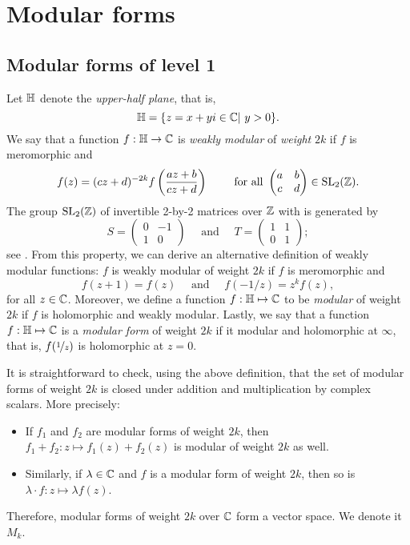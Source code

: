 \section{Modular forms}
\subsection{Modular forms of level 1}
Let $\mathbb{H}$ denote the \textit{upper-half plane}, that is, 
$$\mathbb{H} = \{z = x+yi \in \mathbb{C} | \ y>0 \}.$$
We say that a function $f:\mathbb{H} \to \mathbb{C}$ is \textit{weakly modular} of \textit{weight} $2k$ if $f$ is meromorphic and
$$
f(z) = (cz+d)^{-2k} f \left( \frac{az+b}{cz+d} \right)
\qquad \text{ for all }
\begin{pmatrix} a & b\\
				c & d
\end{pmatrix}
\in \text{SL}_{2}(\mathbb{Z}).
$$
The group $\text{SL}_{2}(\mathbb{Z})$ of invertible 2-by-2 matrices over $\mathbb{Z}$ with  is generated by
$$
S = \begin{pmatrix} 0 & -1 \\
					1 &  0
\end{pmatrix}
\quad \text{ and } \quad
T = \begin{pmatrix} 1 & 1 \\
					0 & 1 
\end{pmatrix};
$$
see \cite[p.1-2]{SL2Z}.
From this property, we can derive an alternative definition of weakly modular functions:
$f$ is weakly modular of weight $2k$ if $f$ is meromorphic and
$$
f(z+1) = f(z) \quad \text{ and } \quad f(-1/z) = z^k f(z),
$$
for all $z \in \mathbb{C}$.
Moreover, we define a function $f:\mathbb{H} \mapsto \mathbb{C}$ to be \textit{modular} of weight $2k$ if $f$ is holomorphic and weakly modular.
Lastly, we say that a function $f:\mathbb{H} \mapsto \mathbb{C}$ is a \textit{modular form} of weight $2k$ if it modular and holomorphic at $\infty$, that is, $f(\nicefrac{1}{z})$ is holomorphic at $z=0$.

It is straightforward to check, using the above definition, that the set of modular forms of weight $2k$ is closed under addition and multiplication by complex scalars.
More precisely:
\begin{itemize}
    \item If $f_1$ and $f_2$ are modular forms of weight $2k$, then $f_1+f_2: z \mapsto f_1(z)+f_2(z)$ is modular of weight $2k$ as well.
    
    \item Similarly, if $\lambda \in \mathbb{C}$ and $f$ is a modular form of weight $2k$, then so is $\lambda \cdot f: z \mapsto \lambda f(z)$.
\end{itemize}
Therefore, modular forms of weight $2k$ over $\mathbb{C}$ form a vector space. We denote it $M_k$.


